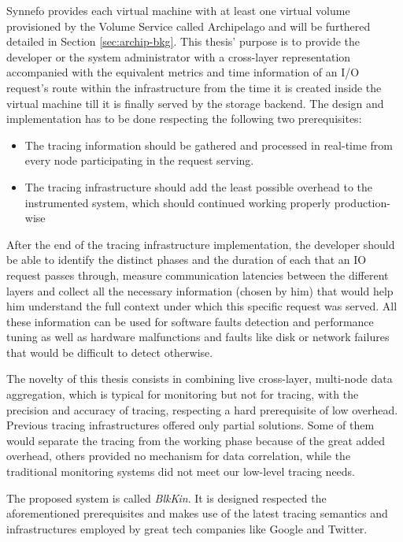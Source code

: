 Synnefo provides each virtual machine with at least one virtual volume
provisioned by the Volume Service called Archipelago\cite{archip-paper} and will
be furthered detailed in Section \ref{sec:archip-bkg}. This thesis' purpose is
to provide the developer or the system administrator with a cross-layer
representation accompanied with the equivalent metrics and time information of
an I/O request's route within the infrastructure from the time it is created
inside the virtual machine till it is finally served by the storage backend. The
design and implementation has to be done respecting the following two
prerequisites:

\begin{itemize}
    \item The tracing information should be gathered and processed in real-time
        from every node participating in the request serving.
    \item The tracing infrastructure should add the least possible overhead to
        the instrumented system, which should continued working properly 
        production-wise
\end{itemize}

After the end of the tracing infrastructure implementation, the developer should
be able to identify the distinct phases and the duration of each that an IO
request passes through, measure communication latencies between the different
layers and collect all the necessary information (chosen by him) that would help
him understand the full context under which this specific request was served.
All these information can be used for software faults detection and performance
tuning as well as hardware malfunctions and faults like disk or network failures
that would be difficult to detect otherwise.

The novelty of this thesis consists in combining live cross-layer, multi-node
data aggregation, which is typical for monitoring but not for tracing, with the
precision and accuracy of tracing, respecting a hard prerequisite of low
overhead. Previous tracing infrastructures offered only partial solutions. Some
of them would separate the tracing from the working phase because of the great
added overhead, others provided no mechanism for data correlation, while the
traditional monitoring systems did not meet our low-level tracing needs.

The proposed system is called \textit{BlkKin}. It is designed respected the
aforementioned prerequisites and makes use of the latest tracing semantics and
infrastructures employed by great tech companies like Google and Twitter.  

